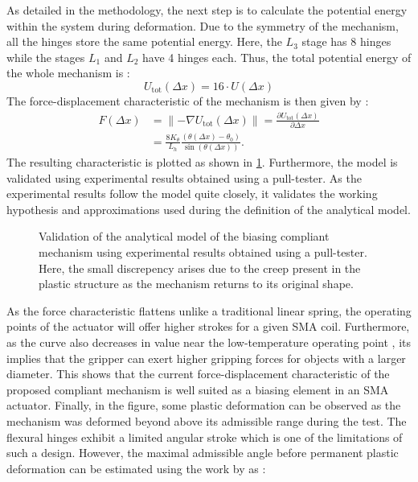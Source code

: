 As detailed in the methodology, the next step is to calculate the potential energy within the system during deformation. Due to the symmetry of the mechanism, all the hinges store the same potential energy. Here, the $L_3$ stage has 8 hinges while the stages $L_1$ and $L_2$ have 4 hinges each. Thus, the total potential energy of the whole mechanism is :
\begin{equation}\label{eq:mandrel-potential-energy-model}
U_\mathrm{tot}(\Delta x) = 16\cdot U(\Delta x)
\end{equation}
The force-displacement characteristic of the mechanism is then given by :
\begin{equation}\label{eq:mandrel-force-model}
\begin{split}
    F(\Delta x) &= \lVert -\nabla{U_\text{tot}(\Delta x)}\rVert = \frac{\partial U_\text{tot}(\Delta x)}{\partial \Delta x}\\
     &= \frac{8K_{\theta}}{L_{h}}  \frac{(\theta(\Delta x)-\theta_{0})}{\sin(\theta(\Delta x))}.
\end{split}
\end{equation}
The resulting characteristic is plotted as shown in \cref{fig:mandrel-am-expt-compare}. Furthermore, the model is validated using experimental results obtained using a pull-tester. As the experimental results follow the model quite closely, it validates the working hypothesis and approximations used during the definition of the analytical model.
\begin{figure}[hbt!] %
  \centering
  \resizebox{0.7\textwidth}{!}{}
  \caption{Validation of the analytical model of the biasing compliant mechanism using experimental results obtained using a pull-tester. Here, the small discrepency arises due to the creep present in the plastic structure as the mechanism returns to its original shape.}
  \label{fig:mandrel-am-expt-compare}
\end{figure}
As the force characteristic flattens unlike a traditional linear spring, the operating points of the actuator will offer higher strokes for a given SMA coil. Furthermore, as the curve also decreases in value near the low-temperature operating point , its implies that the gripper can exert higher gripping forces for objects with a larger diameter. This shows that the current force-displacement characteristic of the proposed compliant mechanism is well suited as a biasing element in an SMA actuator. Finally, in the figure, some plastic deformation can be observed as the mechanism was deformed beyond above its admissible range during the test. The flexural hinges exhibit a limited angular stroke which is one of the limitations of such a design. However, the maximal admissible angle before permanent plastic deformation can be estimated using the work by \cite{heneinConceptionStructuresArticulees2005} as :
